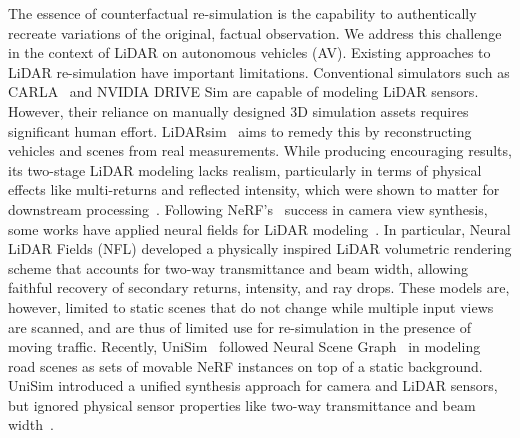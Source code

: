The essence of counterfactual re-simulation is the capability to authentically recreate variations of the original, factual observation. We address this challenge in the context of LiDAR on autonomous vehicles (AV). Existing approaches to LiDAR re-simulation have important limitations. Conventional simulators such as CARLA~\cite{dosovitskiy2017carla} and NVIDIA DRIVE Sim are capable of modeling LiDAR sensors. However, their reliance on manually designed 3D simulation assets requires significant human effort. LiDARsim~\cite{manivasagam2020lidarsim} aims to remedy this by reconstructing vehicles and scenes from real measurements. While producing encouraging results, its two-stage LiDAR modeling lacks realism, particularly in terms of physical effects like multi-returns and reflected intensity, which were shown 
 to matter for downstream processing~\cite{guillard2022learning}. Following NeRF's~\cite{mildenhall2020nerf} success in camera view synthesis, some works have applied neural fields for LiDAR modeling~\cite{Huang2023nfl, tao2023lidar, zhang2023nerf}. In particular, Neural LiDAR Fields (NFL)\cite{Huang2023nfl} developed a physically inspired LiDAR volumetric rendering scheme that accounts for two-way transmittance and beam width, allowing faithful recovery of secondary returns, intensity, and ray drops. These models are, however, limited to static scenes that do not change while multiple input views are scanned, and are thus of limited use for re-simulation in the presence of moving traffic. Recently, UniSim~\cite{yang2023unisim} followed Neural Scene Graph~\cite{Ost_2021_CVPR} in modeling road scenes as sets of movable NeRF instances on top of a static background. UniSim introduced a unified synthesis approach for camera and LiDAR sensors, but ignored physical sensor properties like two-way transmittance and beam width~\cite{Huang2023nfl}.

